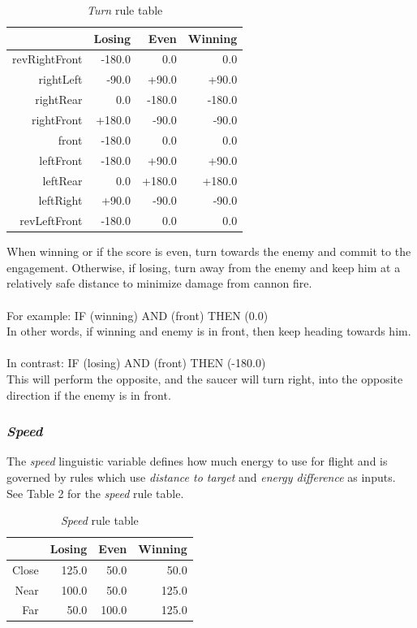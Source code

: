 \begin{table}[H]
\centering
\caption{\emph{Turn} rule table}
\label{Turn rule table}
\begin{tabular}{r|r|r|r}
 				& Losing 	& Even 		& Winning 	\\ \hline
revRightFront	& -180.0	& 0.0		& 0.0 		\\
rightLeft		& -90.0		& +90.0		& +90.0		\\
rightRear		& 0.0		& -180.0	& -180.0 	\\
rightFront		& +180.0	& -90.0 	& -90.0 	\\
front 			& -180.0	& 0.0 		& 0.0 		\\
leftFront 		& -180.0	& +90.0 	& +90.0		\\
leftRear 		& 0.0		& +180.0 	& +180.0 	\\
leftRight 		& +90.0		& -90.0 	& -90.0 	\\
revLeftFront 	& -180.0	& 0.0 		& 0.0 		\\
\end{tabular}
\end{table}

When winning or if the score is even, turn towards the enemy and commit to the engagement. Otherwise, if losing, turn away from the enemy and keep him at a relatively safe distance to minimize damage from cannon fire.
\\
\\
For example: IF (winning) AND (front) THEN (0.0)
\\
In other words, if winning and enemy is in front, then keep heading towards him.
\\
\\
In contrast: IF (losing) AND (front) THEN (-180.0)
\\
This will perform the opposite, and the saucer will turn right, into the opposite direction if the enemy is in front.

\subsubsection{\emph{Speed}}

The \emph{speed} linguistic variable defines how much energy to use for flight and is governed by rules which use \emph{distance to target} and \emph{energy difference} as inputs. See Table 2 for the \emph{speed} rule table.

\begin{table}[H]
\centering
\caption{\emph{Speed} rule table}
\label{Speed rule table}
\begin{tabular}{r|r|r|r}
 		& Losing & Even & Winning \\ \hline
Close	& 125.0 & 50.0 	& 50.0 \\
Near	& 100.0 & 50.0 	& 125.0 \\
Far		& 50.0 	& 100.0 & 125.0 \\
\end{tabular}
\end{table}

